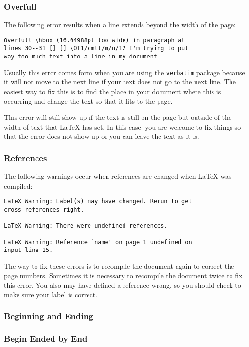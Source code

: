 \subsubsection{Overfull}
\label{sec:overfull}

The following error results when a line extends beyond the width of
the page:
\begin{verbatim}
Overfull \hbox (16.04988pt too wide) in paragraph at
lines 30--31 [] [] \OT1/cmtt/m/n/12 I'm trying to put
way too much text into a line in my document.
\end{verbatim}
Usually this error comes form when you are using the \texttt{verbatim}
package because it will not move to the next line if your text does
not go to the next line.  The easiest way to fix this is to find the
place in your document where this is occurring and change the text so
that it fits to the page.

This error will still show up if the text is still on the page but
outside of the width of text that \LaTeX{} has set.  In this case, you
are welcome to fix things so that the error does not show up or you
can leave the text as it is.

\subsubsection{References}
\label{sec:references-1}

The following warnings occur when references are changed when \LaTeX{}
was compiled:
\begin{verbatim}
LaTeX Warning: Label(s) may have changed. Rerun to get
cross-references right.

LaTeX Warning: There were undefined references.

LaTeX Warning: Reference `name' on page 1 undefined on
input line 15.
\end{verbatim}

The way to fix these errors is to recompile the document again to
correct the page numbers.  Sometimes it is necessary to recompile the
document twice to fix this error.  You also may have defined a
reference wrong, so you should check to make sure your label is
correct.

\subsubsection{Beginning and Ending}
\label{sec:beginning-ending}

\subsubsection{Begin Ended by End}
\label{sec:begin-ended-end}

